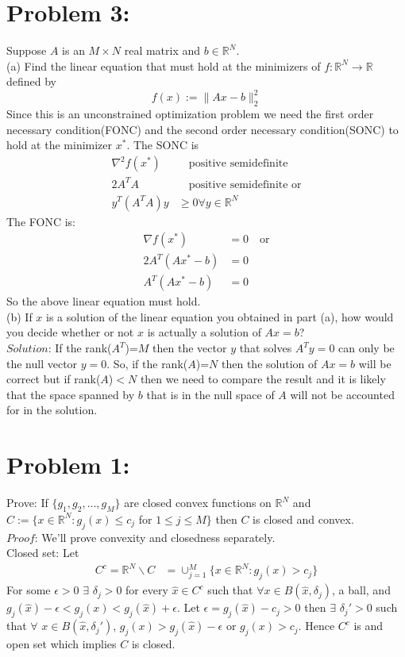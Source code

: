 \documentclass[12pt]{report}
\begin{document}
\section*{Problem 3:}
Suppose $A$ is an $M \times N$ real matrix and $b\in\mathbb{R}^N $. \\
(a) Find the linear equation that must hold at the minimizers of
$f : \mathbb{R}^N \rightarrow \mathbb{R}$ defined by $$ f (x) := \| Ax-b \|_2^2 $$
Since this is an unconstrained optimization problem we need the first order necessary
condition(FONC) and the second order necessary condition(SONC) to hold at the minimizer $x^*$. The
SONC is
\begin{align*}
\nabla^2 f(x^*) & \quad \text{positive semidefinite} \\
2A^TA & \quad \text{positive semidefinite or} \\
y^T(A^TA)y & \geq 0 \forall y \in \mathbb{R}^N
\end{align*}
The FONC is:
\begin{align*}
\nabla f(x^*) &= 0 \quad \text{or} \\
2A^T(Ax^*-b) &= 0 \\
A^T(Ax^*-b) &= 0
\end{align*}
So the above linear equation must hold.\\
(b) If $x$ is a solution of the linear equation you obtained in part (a), how would you decide
whether or not $x$ is actually a solution of $Ax = b$?\\
$Solution$: If the rank($A^T$)=$M$ then the vector $y$ that solves $A^Ty=0$ can only be the null
vector $y=0$. So, if the rank($A$)=$N$ then the solution of $Ax=b$ will be correct but if
rank($A$)$<N$ then we need to compare the result and it is likely that the space spanned by $b$
that is in the null space of $A$ will not be accounted for in the solution.

\pagebreak

\section*{Problem 1:}
Prove: If $\{g_1,g_2,\dots,g_M\}$ are closed convex functions on $\mathbb{R}^N$ and \\
$C:=\{x\in\mathbb{R}^N:g_j(x)\leq c_j$ for $1\leq j \leq M \}$ then $C$ is closed and
convex.\\
$Proof$: We'll prove convexity and closedness separately.\\
Closed set: Let
\begin{align*}
C^c=\mathbb{R}^N \backslash C &= \cup_{j=1}^M \{ x \in \mathbb{R}^N:g_j(x) > c_j \}
\end{align*}
For some $\epsilon>0$ $\exists$ $\delta_j >0$ for every $\hat{x}\in C^c$ such that
$\forall x \in B(\hat{x},\delta_j)$, a ball, and \\
$g_j(\hat{x})-\epsilon<g_j(x)<g_j(\hat{x})+\epsilon$. Let $\epsilon = g_j(\hat{x})-c_j>0$ 
then $\exists$ $\delta_j'>0$ such that
$\forall$ $x\in B(\hat{x},\delta_j')$, $g_j(x)>g_j(\hat{x})-\epsilon$ or $g_j(x)>c_j$. Hence $C^c$
is and open set which implies $C$ is closed.
\end{document}
